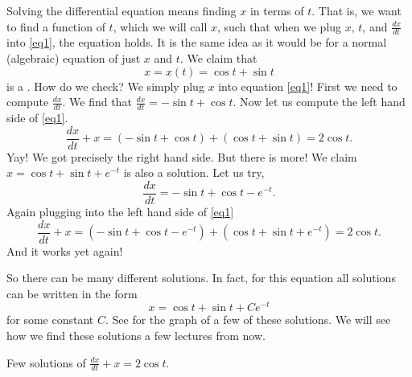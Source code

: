 \documentclass[12pt]{book}
\begin{document}
Solving the differential equation means finding $x$ in terms of $t$.  That
is, we want to find a function of $t$, which we will call $x$, such that when
we plug $x$, $t$, and $\frac{dx}{dt}$ into \eqref{eq1}, the equation holds.
It is
the same idea as it would be for a normal (algebraic) equation of just
$x$ and $t$.  We claim that
\begin{equation*}
x = x(t) = \cos t + \sin t
\end{equation*}
is a \emph{}.
How do we check?  We simply plug $x$ into equation \eqref{eq1}!  First we
need to compute $\frac{dx}{dt}$.  We find that $\frac{dx}{dt} = 
-\sin t + \cos t$.  Now let us compute the left hand side
of \eqref{eq1}.
\begin{equation*}
\frac{dx}{dt} + x = 
(-\sin t + \cos t)
+
(\cos t + \sin t)
=
2\cos t .
\end{equation*}
Yay!  We got precisely the right hand side.
But there is more!
We claim
$x = \cos t + \sin t + e^{-t}$ is also
a solution.  Let us try,
\begin{equation*}
\frac{dx}{dt} = -\sin t + \cos t - e^{-t} .
\end{equation*}
Again plugging into the left hand side of \eqref{eq1}
\begin{equation*}
\frac{dx}{dt} + x = 
(-\sin t + \cos t - e^{-t}) +
(\cos t + \sin t + e^{-t})
= 2\cos t .
\end{equation*}
And it works yet again!

So there can be many different solutions.  In fact, for this equation all
solutions can be written in the form
\begin{equation*}
x = \cos t + \sin t + C e^{-t}
\end{equation*}
for some constant $C$.  See  for the graph of a
few of these solutions. 
We will see how we find these solutions
a few lectures from now.

\begin{diffyfloatingfigurepdfonly}{3.1in}
\capstart
\begin{center}
\caption{Few solutions of $\frac{dx}{dt} + x = 2 \cos t$.\label{intro:plotsfig}}
\end{center}
\end{diffyfloatingfigurepdfonly}
\end{document}
